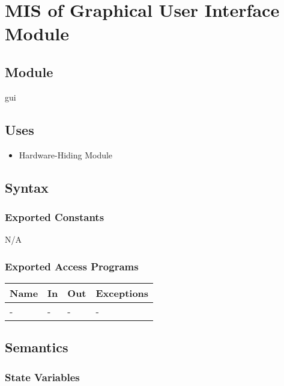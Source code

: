 \documentclass[12pt, titlepage]{article}
\begin{document}
\section{MIS of Graphical User Interface Module} \label{MGUI}

\subsection{Module}

gui
\subsection{Uses}

\begin{itemize}
  \item Hardware-Hiding Module
\end{itemize}

\subsection{Syntax}

\subsubsection{Exported Constants}

N/A

\subsubsection{Exported Access Programs}

\begin{center}
\begin{tabular}{p{2cm} p{4cm} p{4cm} p{2cm}}
\hline
\textbf{Name} & \textbf{In} & \textbf{Out} & \textbf{Exceptions} \\
\hline
- & - & - & - \\
\hline
\end{tabular}
\end{center}

\subsection{Semantics}

\subsubsection{State Variables}
\end{document}
